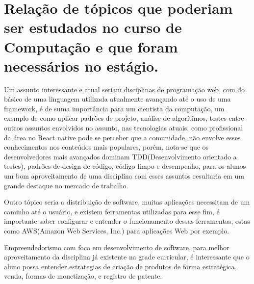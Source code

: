 \documentclass{ufersa}
\begin{document}
\section{Relação de tópicos que poderiam ser estudados no curso de Computação e que foram necessários no estágio.}

Um assunto interessante e atual seriam disciplinas de programação web, com do básico de uma linguagem utilizada atualmente avançando até o uso de uma framework, é de suma importância para um cientista da computação, um exemplo de como aplicar padrões de projeto, análise de algorítimos, testes entre outros assuntos envolvidos no assunto, nas tecnologias atuais, como profissional da área no React native pode se perceber que a comunidade, não envolve esses conhecimentos nos conteúdos mais populares, porém, nota-se que os desenvolvedores mais avançados dominam TDD(Desenvolvimento orientado a testes), padrões de design de código, código limpo e desempenho, para os alunos um bom aproveitamento de uma disciplina com esses assuntos resultaria em um grande destaque no mercado de trabalho. 

Outro tópico seria a distribuição de software, muitas aplicações necessitam de um caminho até o usuário, e existem ferramentas utilizadas para esse fim, é importante saber configurar e entender o funcionamento dessas ferramentas, estas como AWS(Amazon Web Services, Inc.) para aplicações Web por exemplo.

Empreendedorismo com foco em desenvolvimento de software, para melhor aproveitamento da disciplina já existente na grade curricular, é interessante que o aluno possa entender estrategias de criação de produtos de forma estratégica, venda, formas de monetização, e registro de patente.
\end{document}
